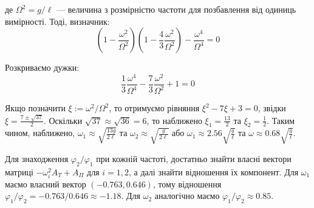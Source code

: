 \documentclass{hw_template}
\begin{document}
де $\Omega^2 = g/\ell$ --- величина з розмірністю частоти для позбавлення 
від одиниць вимірності. Тоді, визначник:
\begin{equation*}
    \left(1 - \frac{\omega^2}{\Omega^2}\right)\left(1 - \frac{4}{3}\frac{\omega^2}{\Omega^2}\right) - \frac{\omega^4}{\Omega^4} = 0
\end{equation*}

Розкриваємо дужки:
\begin{equation*}
    \frac{1}{3} \frac{\omega^4}{\Omega^4}- \frac{7}{3} \frac{\omega^2}{\Omega^2} + 1 = 0
\end{equation*}

Якщо позначити $\xi := \omega^2/\Omega^2$, то отримуємо рівняння
$\xi^2-7\xi+3=0$, звідки $\xi = \frac{7 \pm \sqrt{37}}{2}$. Оскільки $\sqrt{37}
\approx \sqrt{36}=6$, то наближено $\xi_1 = \frac{13}{2}$ та $\xi_2 =
\frac{1}{2}$. Таким чином, наближено, $\omega_1 \approx \sqrt{\frac{13g}{2\ell}}$ та
$\omega_2 \approx \sqrt{\frac{g}{2\ell}}$ або $\omega_1 \approx 2.56\sqrt{\frac{g}{\ell}}$
та $\omega \approx 0.68\sqrt{\frac{g}{\ell}}$.

Для знаходження $\varphi_2/\varphi_1$ при кожній частоті, достатньо знайти
власні вектори матриці $-\omega_i^2A_T + A_{\Pi}$ для $i=1,2$, а далі знайти
відношення їх компонент. Для $\omega_1$ маємо власний вектор $(-0.763,0.646)$,
тому відношення $\varphi_1/\varphi_2 = -0.763/0.646 \approx -1.18$. Для
$\omega_2$ аналогічно маємо $\varphi_1/\varphi_2 \approx 0.85$.
\end{document}

